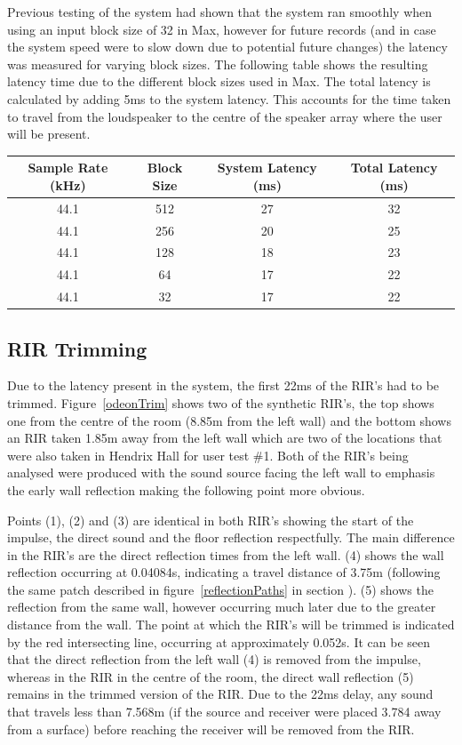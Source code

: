 \documentclass[../../main.tex]{subfiles}
\begin{document}
		Previous testing of the system had shown that the system ran smoothly when using an input block size of 32 in Max, however for future records (and in case the system speed were to slow down due to potential future changes) the latency was measured for varying block sizes. The following table shows the resulting latency time due to the different block sizes used in Max. The total latency is calculated by adding 5ms to the system latency. This accounts for the time taken to travel from the loudspeaker to the centre of the speaker array where the user will be present.


		\begin{center}
		\begin{tabular}{|c |c |c |c|}
		\hline
		Sample Rate (kHz) & Block Size & System Latency (ms) & Total Latency (ms) \\ \hline
		44.1 & 512 & 27 & 32 \\ \hline
		44.1 & 256 & 20 & 25 \\ \hline
		44.1 & 128 & 18 & 23 \\ \hline
		44.1 & 64 & 17 & 22 \\ \hline
		44.1 & 32 & 17 & 22 \\ \hline
		\end{tabular}
		\end{center}


	\subsection{RIR Trimming}
	\label{RIRtrimming}
		Due to the latency present in the system, the first 22ms of the \ac{RIR}'s had to be trimmed. Figure~\ref{odeonTrim} shows two of the synthetic \ac{RIR}'s, the top shows one from the centre of the room (8.85m from the left wall) and the bottom shows an \ac{RIR} taken 1.85m away from the left wall which are two of the locations that were also taken in Hendrix Hall for user test \#1. Both of the \ac{RIR}'s being analysed were produced with the sound source facing the left wall to emphasis the early wall reflection making the following point more obvious. 

		Points (1), (2) and (3) are identical in both \ac{RIR}'s showing the start of the impulse, the direct sound and the floor reflection respectfully. The main difference in the \ac{RIR}'s are the direct reflection times from the left wall. (4) shows the wall reflection occurring at 0.04084s, indicating a travel distance of 3.75m (following the same patch described in figure~\ref{reflectionPaths} in section ). (5) shows the reflection from the same wall, however occurring much later due to the greater distance from the wall. The point at which the \ac{RIR}'s will be trimmed is indicated by the red intersecting line, occurring at approximately 0.052s. It can be seen that the direct reflection from the left wall (4) is removed from the impulse, whereas in the \ac{RIR} in the centre of the room, the direct wall reflection (5) remains in the trimmed version of the \ac{RIR}. Due to the 22ms delay, any sound that travels less than 7.568m (if the source and receiver were placed 3.784 away from a surface) before reaching the receiver will be removed from the \ac{RIR}. 
\end{document}
